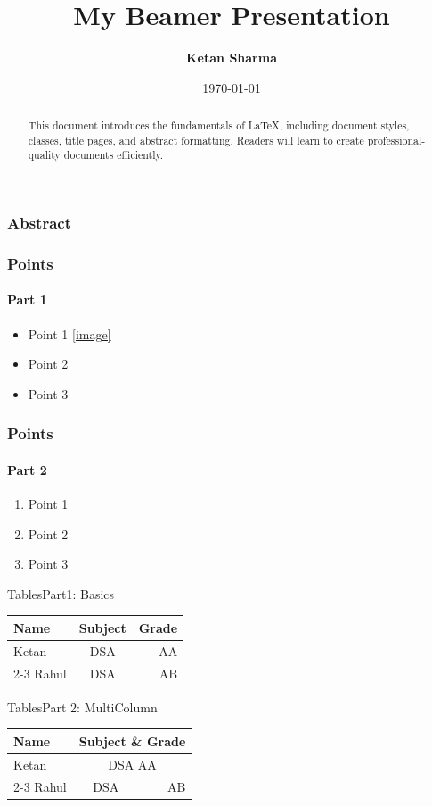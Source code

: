 \documentclass[]{beamer}
\title{{\textbf{My Beamer Presentation}}}
\author{{\textbf{Ketan Sharma}}}
\date[]{\today}
\begin{document}
	\begin{frame}
		\titlepage
	\end{frame}	
	\begin{frame}
	\frametitle{Abstract}
		\begin{abstract}
			This document introduces the fundamentals of
			LaTeX, including document styles, classes, title
			pages, and abstract formatting. Readers will
			learn to create professional-quality documents
			efficiently.
		\end{abstract}
	\end{frame}
	\begin{frame}
		\frametitle{\large{\textbf{Points}}}
		\framesubtitle{Part 1}
		\begin{itemize}
			\item Point 1 \ref{image}
			\item Point 2 \pageref{tables}
			\item Point 3
		\end{itemize}
	\end{frame}
	\begin{frame}
		\frametitle{\large{\textbf{Points}}}
		\framesubtitle{Part 2}
		\begin{enumerate}
			\item Point 1
			\item Point 2
			\item Point 3
		\end{enumerate}
	\end{frame}
	\begin{frame}{Tables}{Part1: Basics}
		\centering
		\begin{tabular}{||l|c|r||}
			\hline
			Name&Subject&Grade\\
			\hline 
			\hline
			Ketan & DSA &AA\\
			\cline{2-3}
			Rahul & DSA &AB\\
			\hline
		\end{tabular}	
	\end{frame}
	\begin{frame}{Tables}{Part 2: MultiColumn}
		\centering
		\begin{table}
			\label{tables}
			\begin{tabular}{||l|c|r||}
				\hline
				Name&\multicolumn{2}{|c||}{Subject \& Grade}  \\
				\hline 
				\hline
				Ketan &\multicolumn{2}{|c||}{DSA \quad\quad\quad\quad AA}\\
				\cline{2-3}
				Rahul & DSA &AB\\
				\hline
			\end{tabular}
		\end{table}
	\end{frame}
\end{document}
